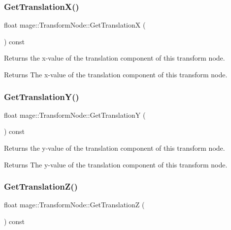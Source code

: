 \subsubsection{\texorpdfstring{Get\+Translation\+X()}{GetTranslationX()}}
{\footnotesize\ttfamily float mage\+::\+Transform\+Node\+::\+Get\+TranslationX (\begin{DoxyParamCaption}{ }\end{DoxyParamCaption}) const}

Returns the x-\/value of the translation component of this transform node.

\begin{DoxyReturn}{Returns}
The x-\/value of the translation component of this transform node. 
\end{DoxyReturn}
\hypertarget{classmage_1_1_transform_node_a0a4d107bb131f23f599ada568d10a330}{}\label{classmage_1_1_transform_node_a0a4d107bb131f23f599ada568d10a330} 
\subsubsection{\texorpdfstring{Get\+Translation\+Y()}{GetTranslationY()}}
{\footnotesize\ttfamily float mage\+::\+Transform\+Node\+::\+Get\+TranslationY (\begin{DoxyParamCaption}{ }\end{DoxyParamCaption}) const}

Returns the y-\/value of the translation component of this transform node.

\begin{DoxyReturn}{Returns}
The y-\/value of the translation component of this transform node. 
\end{DoxyReturn}
\hypertarget{classmage_1_1_transform_node_a0f7a78d289c16750e01ceefda0dea480}{}\label{classmage_1_1_transform_node_a0f7a78d289c16750e01ceefda0dea480} 
\subsubsection{\texorpdfstring{Get\+Translation\+Z()}{GetTranslationZ()}}
{\footnotesize\ttfamily float mage\+::\+Transform\+Node\+::\+Get\+TranslationZ (\begin{DoxyParamCaption}{ }\end{DoxyParamCaption}) const}

